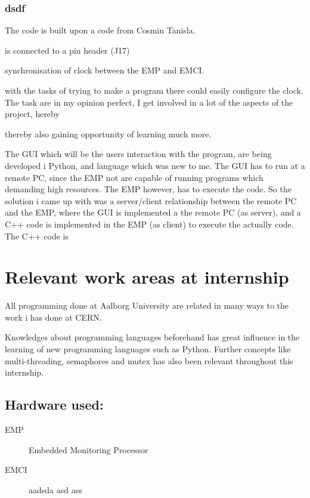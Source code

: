 \subsection{dsdf}



The code is built upon a code from Cosmin Tanisla\cite{linuxuse66:online}.


is connected to a pin header (J17)






synchronisation of clock between the EMP and EMCI. 









with the tasks of trying to make a program there could easily configure the clock. The task are in my opinion perfect, I get involved in a lot of the aspects of the project, hereby 

thereby also gaining opportunity of learning much more.




The GUI which will be the users interaction with the program, are being developed i Python, and language which was new to me. The GUI has to run at a remote PC, since the EMP not are capable of running programs which demanding high resources. The EMP however, has to execute the code. So the solution i came up with was a server/client relationship between the remote PC and the EMP, where the GUI is implemented a the remote PC (as server), and a C++ code is implemented in the EMP (as client) to execute the actually code. The C++ code is 








\chapter{Relevant work areas at internship}

All programming done at Aalborg University are related in many ways to the work i has done at CERN.

Knowledges about programming languages beforehand has great influence in the learning of new programming languages
such as Python. Further concepts like multi-threading, semaphores and mutex has also been relevant throughout this internship.

\section*{Hardware used:}
\begin{description}
    \item[EMP]  Embedded Monitoring Processor
    \item[EMCI] aadsda asd ass
\end{description}

